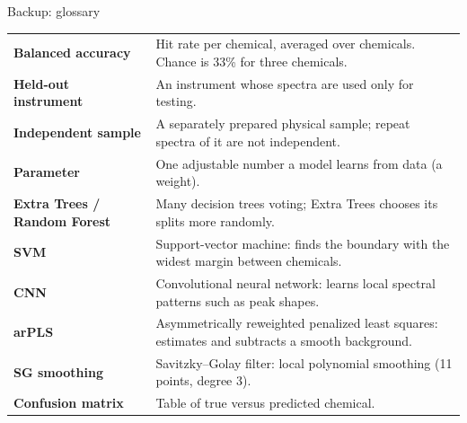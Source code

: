 \documentclass[aspectratio=169,10pt]{beamer}
\begin{document}
\begin{frame}{Backup: glossary}
\small
\renewcommand{\arraystretch}{1.2}
\begin{tabular}{@{}>{\bfseries}p{}p{}@{}}
Balanced accuracy & Hit rate per chemical, averaged over chemicals. Chance is 33\% for three chemicals.\\
Held-out instrument & An instrument whose spectra are used only for testing.\\
Independent sample & A separately prepared physical sample; repeat spectra of it are not independent.\\
Parameter & One adjustable number a model learns from data (a weight).\\
Extra Trees / Random Forest & Many decision trees voting; Extra Trees chooses its splits more randomly.\\
SVM & Support-vector machine: finds the boundary with the widest margin between chemicals.\\
CNN & Convolutional neural network: learns local spectral patterns such as peak shapes.\\
arPLS & Asymmetrically reweighted penalized least squares: estimates and subtracts a smooth background.\\
SG smoothing & Savitzky--Golay filter: local polynomial smoothing (11 points, degree 3).\\
Confusion matrix & Table of true versus predicted chemical.\\
\end{tabular}
\end{frame}
\end{document}
